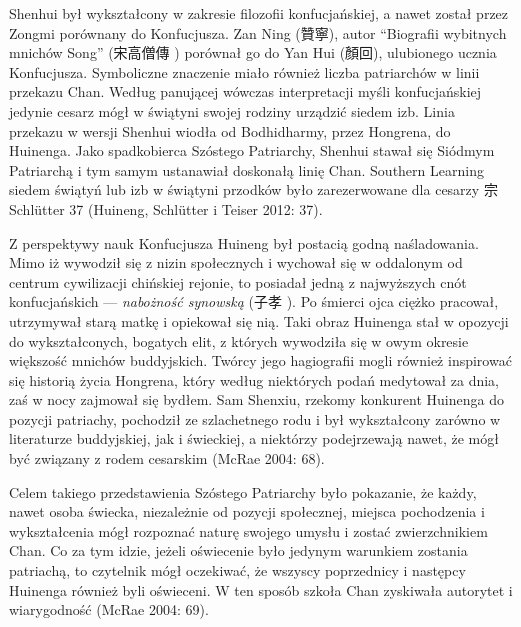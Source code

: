 Shenhui był wykształcony w zakresie filozofii konfucjańskiej, a nawet został przez Zongmi porównany do Konfucjusza. Zan Ning (贊寧), autor ``Biografii wybitnych mnichów Song'' (宋高僧傳 ) porównał go do Yan Hui (顏回), ulubionego ucznia Konfucjusza.
Symboliczne znaczenie miało również liczba patriarchów w linii przekazu Chan. Według panującej wówczas interpretacji myśli konfucjańskiej jedynie cesarz mógł w świątyni swojej rodziny urządzić siedem izb. Linia przekazu w wersji Shenhui wiodła od Bodhidharmy, przez Hongrena, do Huinenga. Jako spadkobierca Szóstego Patriarchy, Shenhui stawał się Siódmym Patriarchą i tym samym ustanawiał doskonałą linię Chan.
Southern Learning
siedem świątyń lub izb w świątyni przodków było zarezerwowane dla cesarzy
宗
Schlütter 37 \fi
(Huineng, Schlütter i Teiser 2012: 37).

Z perspektywy nauk Konfucjusza Huineng był postacią godną naśladowania.
Mimo iż wywodził się z nizin społecznych i wychował się w oddalonym od centrum cywilizacji chińskiej rejonie, to posiadał jedną z najwyższych cnót konfucjańskich --- \textit{nabożność synowską} (子孝 ).
Po śmierci ojca ciężko pracował, utrzymywał starą matkę i opiekował się nią.
Taki obraz Huinenga stał w opozycji do wykształconych, bogatych elit, z których wywodziła się w owym okresie większość mnichów buddyjskich.
Twórcy jego hagiografii mogli również inspirować się historią życia Hongrena, który według niektórych podań medytował za dnia, zaś w nocy zajmował się bydłem.
Sam Shenxiu, rzekomy konkurent Huinenga do pozycji patriachy, pochodził ze szlachetnego rodu i był wykształcony zarówno w literaturze buddyjskiej, jak i świeckiej, a niektórzy podejrzewają nawet, że mógł być związany z rodem cesarskim
(McRae 2004: 68).

Celem takiego przedstawienia Szóstego Patriarchy było pokazanie, że każdy, nawet osoba świecka, niezależnie od pozycji społecznej, miejsca pochodzenia i wykształcenia mógł rozpoznać naturę swojego umysłu i zostać zwierzchnikiem Chan.
Co za tym idzie, jeżeli oświecenie było jedynym warunkiem zostania patriachą, to czytelnik mógł oczekiwać, że wszyscy poprzednicy i następcy Huinenga również byli oświeceni.
W ten sposób szkoła Chan zyskiwała autorytet i wiarygodność (McRae 2004: 69).


